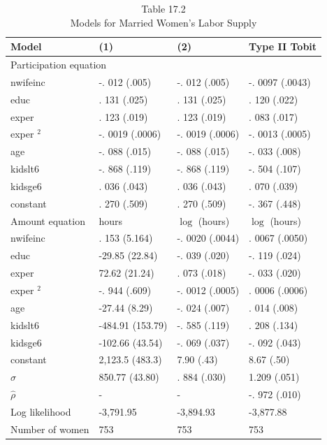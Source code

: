 \documentclass[10pt]{article}
\begin{document}
\begin{table}[h]
\begin{center}
\captionsetup{labelformat=empty}
\caption{Table 17.2\\
Models for Married Women's Labor Supply}
\begin{tabular}{|l|l|l|l|}
\hline
Model & (1) & (2) & Type II Tobit \\
\hline
\multicolumn{4}{|l|}{Participation equation} \\
\hline
nwifeinc & -. 012 (.005) & -. 012 (.005) & -. 0097 (.0043) \\
\hline
educ & . 131 (.025) & . 131 (.025) & . 120 (.022) \\
\hline
exper & . 123 (.019) & . 123 (.019) & . 083 (.017) \\
\hline
exper ${ }^{2}$ & -. 0019 (.0006) & -. 0019 (.0006) & -. 0013 (.0005) \\
\hline
age & -. 088 (.015) & -. 088 (.015) & -. 033 (.008) \\
\hline
kidslt6 & -. 868 (.119) & -. 868 (.119) & -. 504 (.107) \\
\hline
kidsge6 & . 036 (.043) & . 036 (.043) & . 070 (.039) \\
\hline
constant & . 270 (.509) & . 270 (.509) & -. 367 (.448) \\
\hline
Amount equation & hours & $\log$ (hours) & $\log$ (hours) \\
\hline
nwifeinc & . 153 (5.164) & -. 0020 (.0044) & . 0067 (.0050) \\
\hline
educ & -29.85 (22.84) & -. 039 (.020) & -. 119 (.024) \\
\hline
exper & 72.62 (21.24) & . 073 (.018) & -. 033 (.020) \\
\hline
exper ${ }^{2}$ & -. 944 (.609) & -. 0012 (.0005) & . 0006 (.0006) \\
\hline
age & -27.44 (8.29) & -. 024 (.007) & . 014 (.008) \\
\hline
kidslt6 & -484.91 (153.79) & -. 585 (.119) & . 208 (.134) \\
\hline
kidsge6 & -102.66 (43.54) & -. 069 (.037) & -. 092 (.043) \\
\hline
constant & 2,123.5 (483.3) & 7.90 (.43) & 8.67 (.50) \\
\hline
$\hat{\sigma}$ & 850.77 (43.80) & . 884 (.030) & 1.209 (.051) \\
\hline
$\hat{\rho}$ & - & - & -. 972 (.010) \\
\hline
Log likelihood & -3,791.95 & -3,894.93 & -3,877.88 \\
\hline
Number of women & 753 & 753 & 753 \\
\hline
\end{tabular}
\end{center}
\end{table}
\end{document}
